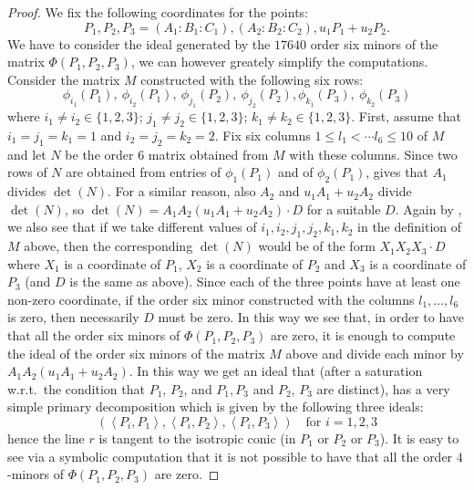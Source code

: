 \documentclass[12pt, a4paper, reqno, captions=tableheading,bibliography=totoc]{scrartcl}
\theoremstyle{plain}
\theoremstyle{definition}
\newcommand{\scl}[2]{\left\langle {#1}, {#2} \right\rangle}
\begin{document}
\begin{proof} We fix the following coordinates for the points:
\[
P_1, P_2, P_3 = (A_1: B_1: C_1), (A_2: B_2: C_2), u_1P_1+u_2P_2.
\]
We have to consider the ideal generated by the $17640$ order six
minors of the matrix $\Phi(P_1, P_2, P_3)$, we can however greately simplify
the computations.
Consider the matrix $M$ constructed with the following six rows:
\[
\phi_{i_1}(P_1), \ \phi_{i_2}(P_1), \ \phi_{j_1}(P_2),\  \phi_{j_2}(P_2),
\phi_{k_1}(P_3), \ \phi_{k_2}(P_3)
\]
where $i_1 \not= i_2 \in \{1, 2, 3\}$; $j_1 \not= j_2 \in \{1, 2, 3\}$;
$k_1 \not= k_2 \in \{1, 2, 3\}$.
First, assume that $i_1=j_1=k_1=1$ and
$i_2=j_2=k_2=2$. Fix six columns
$1\leq l_1 < \cdots l_6 \leq 10$ of $M$ and let $N$ be the order $6$ matrix
obtained from $M$ with these columns. Since two rows of $N$ are obtained from
entries of $\phi_1(P_1)$ and of $\phi_2(P_1)$,
 gives that $A_1$ divides $\det(N)$. For a similar
reason, also $A_2$ and $u_1A_1+u_2A_2$ divide $\det(N)$, so
$\det(N) = A_1A_2(u_1A_1+u_2A_2)\cdot D$ for a suitable $D$.
Again by , we also see that if we take different values of
$i_1, i_2, j_1, j_2, k_1, k_2$ in the definition of $M$ above, then
the corresponding $\det(N)$ would be of the form $X_1X_2X_3\cdot D$ where
$X_1$ is a coordinate of $P_1$, $X_2$ is a coordinate of $P_2$ and $X_3$ is
a coordinate of $P_3$ (and $D$ is the same as above). Since each of the three
points have at least one non-zero coordinate, if the order six minor
constructed with the columns $l_1, \dots, l_6$ is zero, then necessarily $D$
must be zero. In this way we see that, in order to have that all the order
six minors of $\Phi(P_1, P_2, P_3)$ are zero, it is enough to compute the
ideal of the order six minors of the matrix $M$ above and divide each
minor by $A_1A_2(u_1A_1+u_2A_2)$. In this way we get an ideal that (after
a saturation w.r.t.\ the condition that $P_1$, $P_2$, and $P_1, P_3$ and
$P_2$, $P_3$ are distinct), has
a very simple primary decomposition which is given by the following three
ideals:
\[
\left(\scl{P_i}{P_1}, \scl{P_i}{P_2},\scl{P_i}{P_3}\right) \quad
\mbox{for $i = 1, 2, 3$}
\]
hence the line $r$ is tangent to the isotropic conic
(in $P_1$ or $P_2$ or $P_3$).
It is easy to see via a symbolic computation that it is not possible to have that all the order
$4$-minors of $\Phi(P_1, P_2, P_3)$ are zero.
\end{proof}
\end{document}
